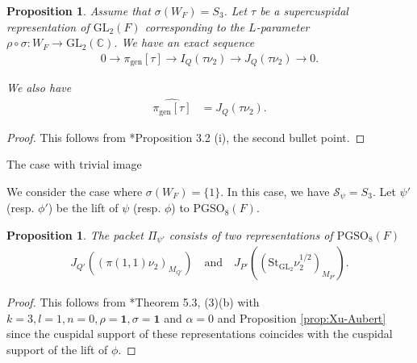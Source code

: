 \documentclass[12pt]{amsart}
\makeatletter
\renewcommand{\subsection}{\@startsection{subsection}{2}%
  \z@{.7\linespacing\@plus.5\linespacing}{.35\linespacing}%
  {\normalfont\bfseries\raggedright}}
\theoremstyle{definition}
\theoremstyle{plain}
\newtheorem{proposition}[definition]{Proposition}
\theoremstyle{remark}
\def\C{\mathbb{C}}%
\def\GL{\mathrm{GL}}
\def\PGSO{\mathrm{PGSO}}
\newcommand{\cS}{\mathcal{S}}
\numberwithin{equation}{section}
\newcommand{\gen}{\mathrm{gen}}
\newcommand{\St}{\mathrm{St}}
\makeatother
\begin{document}
\begin{proposition}
      Assume that $\sigma(W_F) = S_3$.
      Let $\tau$ be a supercuspidal representation of $\GL_2(F)$ corresponding to the $L$-parameter $\rho \circ \sigma \colon W_F \to \GL_2(\C)$.
      We have an exact sequence
      \begin{align*}
            0 \to \pi_{\gen}[\tau] \to I_Q(\tau \nu_2) \to J_Q(\tau \nu_2) \to 0.
      \end{align*}

      We also have 
      \begin{align*}
            \widehat{\pi_{\gen}[\tau]} &= J_Q(\tau \nu_2).
      \end{align*}
\end{proposition}

\begin{proof}
      This follows from \cite{GanSavin2023-HoweDualityDichotomyExceptionalThetaCorrespondences}*{Proposition 3.2 (i), the second bullet point}.
\end{proof}


\subsection{The case with trivial image}\label{sec:subregular-trivial}

We consider the case where $\sigma(W_F) = \{1\}$.
In this case, we have $\cS_{\psi} = S_3$.
Let $\psi'$ (resp. $\phi'$) be the lift of $\psi$ (resp. $\phi$) to $\PGSO_8(F)$.

\begin{proposition}\label{prop:subregular-trivial-A-packet-lift-PGSO8}
      The packet $\Pi_{\psi'}$ consists of two representations of $\PGSO_8(F)$
      \begin{align*}
            J_{Q'}((\pi(1, 1)\nu_2)_{M_{Q'}})
            \quad
            \text{and}
            \quad 
            J_{P'} ((\St_{\GL_2}\nu_2^{1/2})_{M_{P'}}).
      \end{align*}
\end{proposition}

\begin{proof}
      This follows from \cite{BanJantzen2003-DegeneratePrincipalSeriesEvenOrthogonalGroups}*{Theorem 5.3, (3)(b)} with $k=3, l=1, n=0, \rho = \mathbf{1}, \sigma = \mathbf{1}$ and $\alpha = 0$ and Proposition \ref{prop:Xu-Aubert} since the cuspidal support of these representations coincides with the cuspidal support of the lift of $\phi$.
\end{proof}
\end{document}
